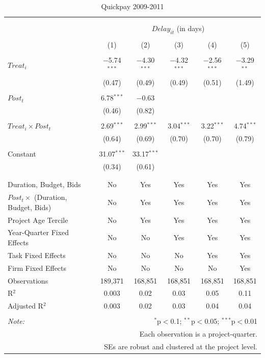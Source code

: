 \documentclass[
]{article}
\begin{document}
\begin{table}[H] \centering 
  \caption{Quickpay 2009-2011} 
  \label{} 
\small 
\begin{tabular}{@{\extracolsep{-2pt}}lccccc} 
\\[-1.8ex]\hline 
\hline \\[-1.8ex] 
\\[-1.8ex] & \multicolumn{5}{c}{$Delay_{it}$ (in days)} \\ 
\\[-1.8ex] & (1) & (2) & (3) & (4) & (5)\\ 
\hline \\[-1.8ex] 
 $Treat_i$ & $-$5.74$^{***}$ & $-$4.30$^{***}$ & $-$4.32$^{***}$ & $-$2.56$^{***}$ & $-$3.29$^{**}$ \\ 
  & (0.47) & (0.49) & (0.49) & (0.51) & (1.49) \\ 
  & & & & & \\ 
 $Post_t$ & 6.78$^{***}$ & $-$0.63 &  &  &  \\ 
  & (0.46) & (0.82) &  &  &  \\ 
  & & & & & \\ 
 $Treat_i \times Post_t$ & 2.69$^{***}$ & 2.99$^{***}$ & 3.04$^{***}$ & 3.22$^{***}$ & 4.74$^{***}$ \\ 
  & (0.64) & (0.69) & (0.70) & (0.70) & (0.79) \\ 
  & & & & & \\ 
 Constant & 31.07$^{***}$ & 33.17$^{***}$ &  &  &  \\ 
  & (0.34) & (0.61) &  &  &  \\ 
  & & & & & \\ 
\hline \\[-1.8ex] 
Duration, Budget, Bids & No & Yes & Yes & Yes & Yes \\ 
$Post_t \times$  (Duration, Budget, Bids) & No & Yes & Yes & Yes & Yes \\ 
Project Age Tercile & No & Yes & Yes & Yes & Yes \\ 
Year-Quarter Fixed Effects & No & No & Yes & Yes & Yes \\ 
Task Fixed Effects & No & No & No & Yes & Yes \\ 
Firm Fixed Effects & No & No & No & No & Yes \\ 
Observations & 189,371 & 168,851 & 168,851 & 168,851 & 168,851 \\ 
R$^{2}$ & 0.003 & 0.02 & 0.03 & 0.05 & 0.11 \\ 
Adjusted R$^{2}$ & 0.003 & 0.02 & 0.03 & 0.04 & 0.04 \\ 
\hline 
\hline \\[-1.8ex] 
\textit{Note:}  & \multicolumn{5}{r}{$^{*}$p$<$0.1; $^{**}$p$<$0.05; $^{***}$p$<$0.01} \\ 
 & \multicolumn{5}{r}{Each observation is a project-quarter.} \\ 
 & \multicolumn{5}{r}{SEs are robust and clustered at the project level.} \\ 
\end{tabular} 
\end{table}
\end{document}
